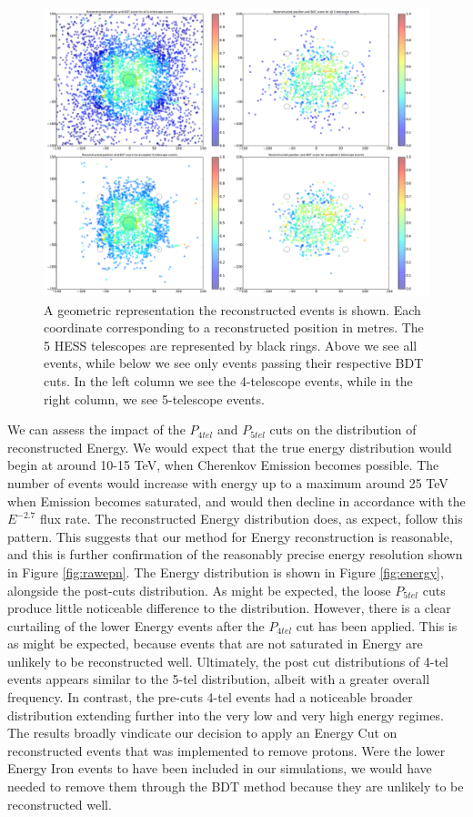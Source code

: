 \documentclass[11pt]{article}
\begin{document}
\begin{figure}
\begin{center}
\includegraphics[width=\textwidth]{bdtmap}
\caption{A geometric representation the reconstructed events is shown. Each coordinate corresponding to a reconstructed position in metres. The 5 HESS telescopes are represented by black rings. Above we see all events, while below we see only events passing their respective BDT cuts. In the left column we see the 4-telescope events, while in the right column, we see 5-telescope events.}
\label{fig:bdtmap}
\end{center}
\end{figure}

We can assess the impact of the $P_{4tel}$ and $P_{5tel}$ cuts on the distribution of reconstructed Energy. We would expect that the true energy distribution would begin at around 10-15 TeV, when Cherenkov Emission becomes possible. The number of events would increase with energy up to a maximum around 25 TeV when Emission becomes saturated, and would then decline in accordance with the $E^{-2.7}$ flux rate. The reconstructed Energy distribution does, as expect, follow this pattern. This suggests that our method for Energy reconstruction is reasonable, and this is further confirmation of the reasonably precise energy resolution shown in Figure \ref{fig:rawepn}. The Energy distribution is shown in Figure \ref{fig:energy}, alongside the post-cuts distribution. As might be expected, the loose $P_{5tel}$ cuts produce little noticeable difference to the distribution. However, there is a clear curtailing of the lower Energy events after the $P_{4tel}$ cut has been applied. This is as might be expected, because events that are not saturated in Energy are unlikely to be reconstructed well. Ultimately, the post cut distributions of 4-tel events appears similar to the 5-tel distribution, albeit with a greater overall frequency. In contrast, the pre-cuts 4-tel events had a noticeable broader distribution extending further into the very low and very high energy regimes. The results broadly vindicate our decision to apply an Energy Cut on reconstructed events that was implemented to remove protons. Were the lower Energy Iron events to have been included in our simulations, we would have needed to remove them through the BDT method because they are unlikely to be reconstructed well. 
\end{document}
